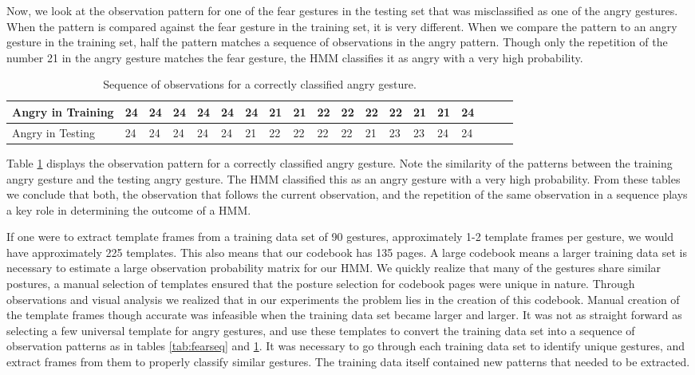 \documentclass[]{report}   %
\begin{document}
Now, we look at the observation pattern for one of the fear gestures in the testing set that was misclassified as one of the angry gestures. When the pattern is compared against the fear gesture in the training set, it is very different. When we compare the pattern to an angry gesture in the training set, half the pattern matches a sequence of observations in the angry pattern. Though only the repetition of the number 21 in the angry gesture matches the fear gesture, the HMM classifies it as angry with a very high probability.

\begin{table}[htbp]
	\centering
		\begin{tabular}{|l|*{18}{l|}}
		\hline
		 	Angry in Training	&24	&24	&24	&24	&24	&24	&21	&21	&22	&22	&22	&22	&21	&21	&24	\\ \hline
		 	Angry in Testing	&24	&24	&24	&24	&24	&21	&22	&22	&22	&22	&21	&23	&23	&24	&24	\\
		\hline
		\end{tabular}
	\caption{Sequence of observations for a correctly classified angry gesture.}
	\label{tab:angryseq}
\end{table}

Table \ref{tab:angryseq} displays the observation pattern for a correctly classified angry gesture. Note the similarity of the patterns between the training angry gesture and the testing angry gesture. The HMM classified this as an angry gesture with a very high probability. From these tables we conclude that both, the observation that follows the current observation, and the repetition of the same observation in a sequence plays a key role in determining the outcome of a HMM.

If one were to extract template frames from a training data set of 90 gestures, approximately 1-2 template frames per gesture, we would have approximately 225 templates. This also means that our codebook has 135 pages. A large codebook means a larger training data set is necessary to estimate a large observation probability matrix for our HMM. We quickly realize that many of the gestures share similar postures, a manual selection of templates ensured that the posture selection for codebook pages were unique in nature. Through observations and visual analysis we realized that in our experiments the problem lies in the creation of this codebook. Manual creation of the template frames though accurate was infeasible when the training data set became larger and larger. It was not as straight forward as selecting a few universal template for angry gestures, and use these templates to convert the training data set into a sequence of observation patterns as in tables \ref{tab:fearseq} and \ref{tab:angryseq}. It was necessary to go through each training data set to identify unique gestures, and extract frames from them to properly classify similar gestures. The training data itself contained new patterns that needed to be extracted. 
\end{document}
